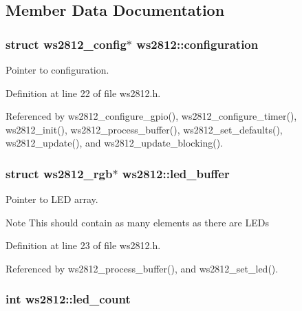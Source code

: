 \subsection{Member Data Documentation}
\hypertarget{structws2812_a4b69cc515557cd305ebfd3372fc09f81}{}
\subsubsection[{configuration}]{\setlength{\rightskip}{0pt plus 5cm}struct {\bf ws2812\+\_\+config}$\ast$ ws2812\+::configuration}\label{structws2812_a4b69cc515557cd305ebfd3372fc09f81}


Pointer to configuration. 



Definition at line 22 of file ws2812.\+h.



Referenced by ws2812\+\_\+configure\+\_\+gpio(), ws2812\+\_\+configure\+\_\+timer(), ws2812\+\_\+init(), ws2812\+\_\+process\+\_\+buffer(), ws2812\+\_\+set\+\_\+defaults(), ws2812\+\_\+update(), and ws2812\+\_\+update\+\_\+blocking().

\hypertarget{structws2812_a9d672a2d9ea381c7fcd940ba4ebdebe2}{}
\subsubsection[{led\+\_\+buffer}]{\setlength{\rightskip}{0pt plus 5cm}struct {\bf ws2812\+\_\+rgb}$\ast$ ws2812\+::led\+\_\+buffer}\label{structws2812_a9d672a2d9ea381c7fcd940ba4ebdebe2}


Pointer to L\+E\+D array. 

\begin{DoxyNote}{Note}
This should contain as many elements as there are L\+E\+Ds 
\end{DoxyNote}


Definition at line 23 of file ws2812.\+h.



Referenced by ws2812\+\_\+process\+\_\+buffer(), and ws2812\+\_\+set\+\_\+led().

\hypertarget{structws2812_aaed6db83ce4a0e8e58b73650f2b4638e}{}
\subsubsection[{led\+\_\+count}]{\setlength{\rightskip}{0pt plus 5cm}int ws2812\+::led\+\_\+count}\label{structws2812_aaed6db83ce4a0e8e58b73650f2b4638e}



